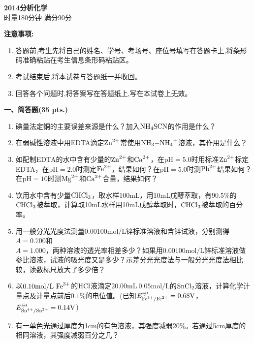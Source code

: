 \begin{center}
    {\LARGE \textbf{2014分析化学}} \\[2ex]
    {\large 时量180分钟 \quad 满分90分}
\end{center}

\vspace{0.5cm}
\noindent\textbf{注意事项:}
\begin{enumerate}[label=\arabic*., parsep=0pt, itemsep=0pt]
    \item 答题前,考生先将自己的姓名、学号、考场号、座位号填写在答题卡上,将条形码准确粘贴在考生信息条形码粘贴区。
    \item 考试结束后,将本试卷与答题纸一并收回。
    \item 回答各个问题时,将答案写在答题纸上,写在本试卷上无效。
\end{enumerate}

\vspace{0.5cm}
\noindent\textbf{一、简答题(35 pts.)}

\begin{enumerate}[label=\arabic*., itemsep=1.5ex]
    \item 碘量法定铜的主要误差来源是什么？加入$\ce{NH4SCN}$的作用是什么？
    \item 在弱碱性溶液中用EDTA滴定$\ce{Zn^{2+}}$常使用$\ce{NH3-NH4+}$溶液，其作用是什么？
    \item 如配制EDTA的水中含有少量的$\ce{Zn^{2+}}$和$\ce{Ca^{2+}}$，在$\mathrm{pH}=5.0$时用标准$\ce{Zn^{2+}}$标定EDTA，在$\mathrm{pH}=2.0$时测定$\ce{Fe^{3+}}$，结果如何？在$\mathrm{pH}=5.0$时测$\ce{Pb^{2+}}$结果如何？在$\mathrm{pH}=10$时测$\ce{Mg^{2+}}$和$\ce{Ca^{2+}}$合量，结果如何？
    \item 饮用水中含有少量$\ce{CHCl3}$，取水样100mL，用10mL戊醇萃取，有90.5\%的$\ce{CHCl3}$被萃取，计算取10mL水样用10mL戊醇萃取时，$\ce{CHCl3}$被萃取的百分率。
    \item 用一般分光光度法测量$0.00100\mathrm{mol/L}$锌标准溶液和含锌试液，分别测得$A=0.700$和
    \\
    $A=1.000$，两种溶液的透光率相差多少？如果用$0.00100\mathrm{mol/L}$锌标准溶液做参比溶液，试液的吸光度又是多少？示差分光光度法与一般分光光度法相比较，读数标尺放大了多少倍？
    \item 以$0.10\mathrm{mol/L}\ \ce{Fe^{3+}}$的$\ce{HCl}$液滴定$20.00\mathrm{mL}\ 0.05\mathrm{mol/L}$的$\ce{SnCl2}$溶液，计算化学计量点及计量点前后$0.1\%$的电位值。(已知$E^{\ominus\prime}_{\ce{Fe^{3+}/Fe^{2+}}}=0.68\mathrm{V}$，$E^{\ominus\prime}_{\ce{Sn^{4+}/Sn^{2+}}}=0.14\mathrm{V}$)
    \item 有一单色光通过厚度为1cm的有色溶液，其强度减弱20\%。若通过5cm厚度的相同溶液，其强度减弱百分之几？
\end{enumerate}

